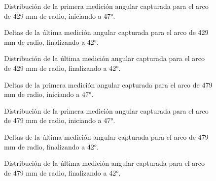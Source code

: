 \begin{figure}[H]
	\centering
	\caption{Distribución de la primera medición angular capturada para el arco de 429 mm de radio, iniciando a 47°.}
	\label{fig:histograma_theta47_7}
\end{figure}

\begin{figure}[H]
	\centering
	\caption{Deltas de la última medición angular capturada para el arco de 429 mm de radio, finalizando a 42°.}
	\label{fig:lecturas_theta42_7}
\end{figure}

\begin{figure}[H]
	\centering
	\caption{Distribución de la última medición angular capturada para el arco de 429 mm de radio, finalizando a 42°.}
	\label{fig:histograma_theta42_7}
\end{figure}

\begin{figure}[H]
	\centering
	\caption{Deltas de la primera medición angular capturada para el arco de 479 mm de radio, iniciando a 47°.}
	\label{fig:lecturas_theta47_8}
\end{figure}

\begin{figure}[H]
	\centering
	\caption{Distribución de la primera medición angular capturada para el arco de 479 mm de radio, iniciando a 47°.}
	\label{fig:histograma_theta47_8}
\end{figure}

\begin{figure}[H]
	\centering
	\caption{Deltas de la última medición angular capturada para el arco de 479 mm de radio, finalizando a 42°.}
	\label{fig:lecturas_theta42_8}
\end{figure}

\begin{figure}[H]
	\centering
	\caption{Distribución de la última medición angular capturada para el arco de 479 mm de radio, finalizando a 42°.}
	\label{fig:histograma_theta42_8}
\end{figure}



